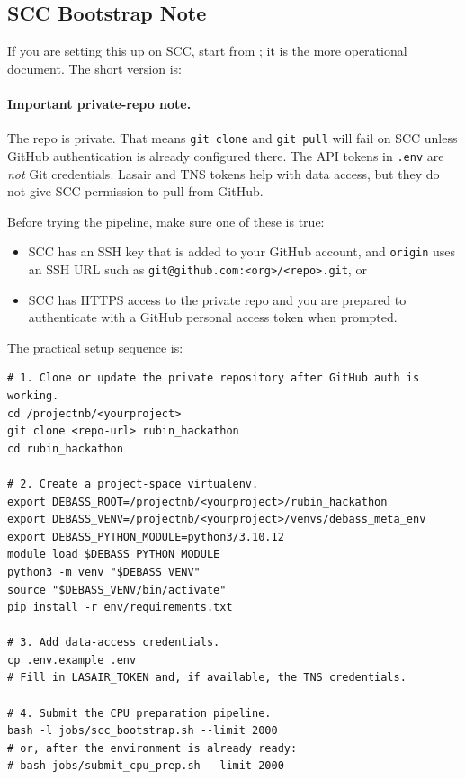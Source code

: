 \documentclass[11pt]{article}
\newcommand{\code}[1]{\texttt{#1}}
\newcommand{\filepath}[1]{\path{#1}}
\begin{document}
\subsection{SCC Bootstrap Note}

If you are setting this up on SCC, start from \filepath{README_scc.md}; it is the more operational document. The short version is:

\paragraph{Important private-repo note.}
The repo is private. That means \code{git clone} and \code{git pull} will fail on SCC unless GitHub authentication is already configured there. The API tokens in \code{.env} are \emph{not} Git credentials. Lasair and TNS tokens help with data access, but they do not give SCC permission to pull from GitHub.

Before trying the pipeline, make sure one of these is true:

\begin{itemize}
\item SCC has an SSH key that is added to your GitHub account, and \code{origin} uses an SSH URL such as \code{git@github.com:<org>/<repo>.git}, or
\item SCC has HTTPS access to the private repo and you are prepared to authenticate with a GitHub personal access token when prompted.
\end{itemize}

The practical setup sequence is:

\begin{verbatim}
# 1. Clone or update the private repository after GitHub auth is working.
cd /projectnb/<yourproject>
git clone <repo-url> rubin_hackathon
cd rubin_hackathon

# 2. Create a project-space virtualenv.
export DEBASS_ROOT=/projectnb/<yourproject>/rubin_hackathon
export DEBASS_VENV=/projectnb/<yourproject>/venvs/debass_meta_env
export DEBASS_PYTHON_MODULE=python3/3.10.12
module load $DEBASS_PYTHON_MODULE
python3 -m venv "$DEBASS_VENV"
source "$DEBASS_VENV/bin/activate"
pip install -r env/requirements.txt

# 3. Add data-access credentials.
cp .env.example .env
# Fill in LASAIR_TOKEN and, if available, the TNS credentials.

# 4. Submit the CPU preparation pipeline.
bash -l jobs/scc_bootstrap.sh --limit 2000
# or, after the environment is already ready:
# bash jobs/submit_cpu_prep.sh --limit 2000
\end{verbatim}
\end{document}
